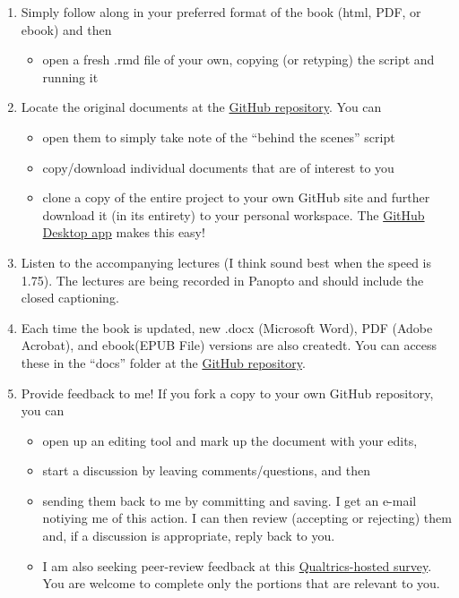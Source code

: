 \documentclass[
  11pt,
]{book}
\providecommand{\tightlist}{%
  \setlength{\itemsep}{0pt}\setlength{\parskip}{0pt}}
\begin{document}
\begin{enumerate}
\def\labelenumi{\arabic{enumi}.}
\item
  Simply follow along in your preferred format of the book (html, PDF, or ebook) and then

  \begin{itemize}
  \tightlist
  \item
    open a fresh .rmd file of your own, copying (or retyping) the script and running it
  \end{itemize}
\item
  Locate the original documents at the \href{https://github.com/lhbikos/ReCenterPsychStats}{GitHub repository}. You can

  \begin{itemize}
  \tightlist
  \item
    open them to simply take note of the ``behind the scenes'' script
  \item
    copy/download individual documents that are of interest to you
  \item
    clone a copy of the entire project to your own GitHub site and further download it (in its entirety) to your personal workspace. The \href{https://desktop.github.com/}{GitHub Desktop app} makes this easy!
  \end{itemize}
\item
  Listen to the accompanying lectures (I think sound best when the speed is 1.75). The lectures are being recorded in Panopto and should include the closed captioning.
\item
  Each time the book is updated, new .docx (Microsoft Word), PDF (Adobe Acrobat), and ebook(EPUB File) versions are also createdt. You can access these in the ``docs'' folder at the \href{https://github.com/lhbikos/ReCenterPsychStats}{GitHub repository}.
\item
  Provide feedback to me! If you fork a copy to your own GitHub repository, you can

  \begin{itemize}
  \tightlist
  \item
    open up an editing tool and mark up the document with your edits,
  \item
    start a discussion by leaving comments/questions, and then
  \item
    sending them back to me by committing and saving. I get an e-mail notiying me of this action. I can then review (accepting or rejecting) them and, if a discussion is appropriate, reply back to you.
  \item
    I am also seeking peer-review feedback at this \href{https://spupsych.az1.qualtrics.com/jfe/form/SV_0OnBLfut3VIOIS2}{Qualtrics-hosted survey}. You are welcome to complete only the portions that are relevant to you.
  \end{itemize}
\end{enumerate}
\end{document}
